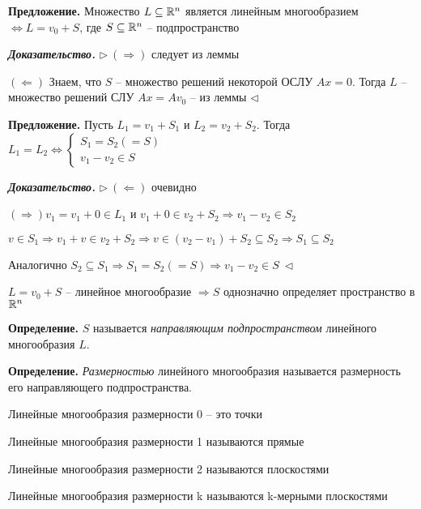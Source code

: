 \vspace{\baselineskip}
\textbf{Предложение.} Множество $L \subseteq \mathbb{R}^n$ является линейным многообразием $\Leftrightarrow L = v_0 + S$, где $S \subseteq \mathbb{R}^n$ -- подпространство

\vspace{\baselineskip}
\textbf{\textit{Доказательство.}} $\rhd \ (\Rightarrow)$ следует из леммы

$(\Leftarrow)$ Знаем, что $S$ -- множество решений некоторой ОСЛУ $Ax = 0$. Тогда $L$ -- множество решений СЛУ $Ax = A v_0$ -- из леммы $\lhd$

\vspace{\baselineskip}
\textbf{Предложение.} Пусть $L_1 = v_1 + S_1$ и $L_2 = v_2 + S_2$. Тогда $L_1 = L_2 \Leftrightarrow \begin{cases} S_1 = S_2 (= S) \\ v_1 - v_2 \in S \end{cases}$

\vspace{\baselineskip}
\textbf{\textit{Доказательство.}} $\rhd \ (\Leftarrow)$ очевидно

$(\Rightarrow) v_1 = v_1 + 0 \in L_1$ и $v_1 + 0 \in v_2 + S_2 \Rightarrow v_1 - v_2 \in S_2$

$v \in S_1 \Rightarrow v_1 + v \in v_2 + S_2 \Rightarrow v \in (v_2 - v_1) + S_2 \subseteq S_2 \Rightarrow S_1 \subseteq S_2$

Аналогично $S_2 \subseteq S_1 \Rightarrow S_1 = S_2 (=S) \Rightarrow v_1 - v_2 \in S \ \lhd$

\vspace{\baselineskip}
$L = v_0 + S$ -- линейное многообразие $\Rightarrow S$ однозначно определяет пространство в $\mathbb{R}^n$

\vspace{\baselineskip}
\textbf{Определение.} $S$ называется \textit{направляющим подпространством} линейного многообразия $L$.

\vspace{\baselineskip}
\textbf{Определение.} \textit{Размерностью} линейного многообразия называется размерность его направляющего подпространства.

Линейные многообразия размерности 0 -- это точки

Линейные многообразия размерности 1 называются прямые

Линейные многообразия размерности 2 называются плоскостями

Линейные многообразия размерности k называются k-мерными плоскостями


